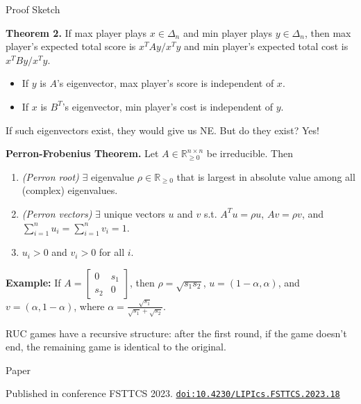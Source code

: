 \documentclass[final,20pt]{beamer}
\newlength{\colwidth}
\begin{document}
\begin{frame}[t]
\begin{columns}[t]
\begin{column}{\colwidth}
\begin{block}{Proof Sketch}

\textbf{Theorem 2.}
If max player plays $x \in \Delta_n$ and min player plays $y \in \Delta_n$,
then max player's expected total score is $x^TAy/x^Ty$
and min player's expected total cost is $x^TBy/x^Ty$.

\begin{itemize}
\item If $y$ is $A$'s eigenvector, max player's score is independent of $x$.
\item If $x$ is $B^T$'s eigenvector, min player's cost is independent of $y$.
\end{itemize}

If such eigenvectors exist, they would give us NE.
But do they exist? Yes!

\textbf{Perron-Frobenius Theorem.}
Let $A \in \mathbb{R}_{\ge 0}^{n \times n}$ be irreducible. Then
\begin{enumerate}
\item \emph{(Perron root)}
    $\exists$ eigenvalue $\rho \in \mathbb{R}_{\ge 0}$ that is largest in absolute value
    among all (complex) eigenvalues.
\item \emph{(Perron vectors)}
    $\exists$ unique vectors $u$ and $v$ s.t. $A^Tu = \rho u$, $Av = \rho v$,
    and $\sum_{i=1}^n u_i = \sum_{i=1}^n v_i = 1$.
\item $u_i > 0$ and $v_i > 0$ for all $i$.
\end{enumerate}

\textbf{Example:}
If $A = \begin{bmatrix}0 & s_1 \\ s_2 & 0\end{bmatrix}$, then
$\rho = \sqrt{s_1s_2}$, $u = (1 - \alpha, \alpha)$, and $v = (\alpha, 1 - \alpha)$,
where $\alpha = \displaystyle\frac{\sqrt{s_1}}{\sqrt{s_1} + \sqrt{s_2}}$.


RUC games have a recursive structure:
after the first round, if the game doesn't end,
the remaining game is identical to the original.
\end{block}

\begin{block}{Paper}

Published in conference FSTTCS 2023.
\href{https://doi.org/10.4230/LIPIcs.FSTTCS.2023.18}{\texttt{doi:10.4230/LIPIcs.FSTTCS.2023.18}}


\end{block}
\end{column}
\end{columns}
\end{frame}
\end{document}
